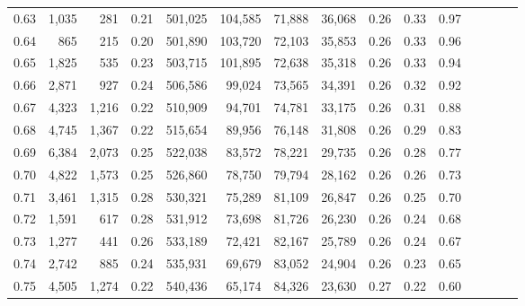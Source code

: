 \begin{tabular}{rrrcrrrrrrrrrrr}
0.63 &   1,035 &    281 &                                       0.21 &  501,025 &  104,585 &   71,888 &   36,068 &  0.26 &  0.33 &                         0.97 \\
0.64 &     865 &    215 &                                       0.20 &  501,890 &  103,720 &   72,103 &   35,853 &  0.26 &  0.33 &                         0.96 \\
0.65 &   1,825 &    535 &                                       0.23 &  503,715 &  101,895 &   72,638 &   35,318 &  0.26 &  0.33 &                         0.94 \\
0.66 &   2,871 &    927 &                                       0.24 &  506,586 &   99,024 &   73,565 &   34,391 &  0.26 &  0.32 &                         0.92 \\
0.67 &   4,323 &  1,216 &                                       0.22 &  510,909 &   94,701 &   74,781 &   33,175 &  0.26 &  0.31 &                         0.88 \\
0.68 &   4,745 &  1,367 &                                       0.22 &  515,654 &   89,956 &   76,148 &   31,808 &  0.26 &  0.29 &                         0.83 \\
0.69 &   6,384 &  2,073 &                                       0.25 &  522,038 &   83,572 &   78,221 &   29,735 &  0.26 &  0.28 &                         0.77 \\
0.70 &   4,822 &  1,573 &                                       0.25 &  526,860 &   78,750 &   79,794 &   28,162 &  0.26 &  0.26 &                         0.73 \\
0.71 &   3,461 &  1,315 &                                       0.28 &  530,321 &   75,289 &   81,109 &   26,847 &  0.26 &  0.25 &                         0.70 \\
0.72 &   1,591 &    617 &                                       0.28 &  531,912 &   73,698 &   81,726 &   26,230 &  0.26 &  0.24 &                         0.68 \\
0.73 &   1,277 &    441 &                                       0.26 &  533,189 &   72,421 &   82,167 &   25,789 &  0.26 &  0.24 &                         0.67 \\
0.74 &   2,742 &    885 &                                       0.24 &  535,931 &   69,679 &   83,052 &   24,904 &  0.26 &  0.23 &                         0.65 \\
0.75 &   4,505 &  1,274 &                                       0.22 &  540,436 &   65,174 &   84,326 &   23,630 &  0.27 &  0.22 &                         0.60 \\

\end{tabular}
